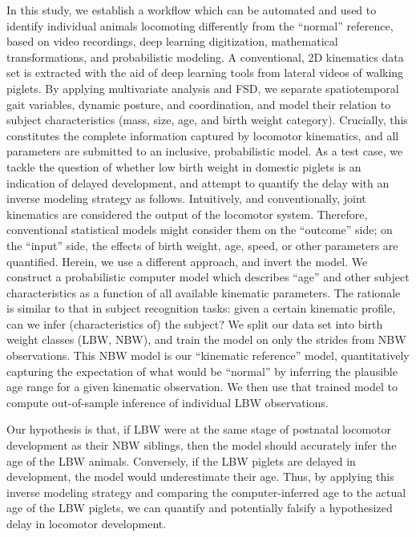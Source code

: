\bigskip
\pagebreak

In this study, we establish a workflow which can be automated and used to identify individual animals locomoting differently from the ``normal'' reference, based on video recordings, deep learning digitization, mathematical transformations, and probabilistic modeling.
A conventional, 2D kinematics data set is extracted with the aid of deep learning tools from lateral videos of walking piglets.
By applying multivariate analysis and FSD, we separate spatiotemporal gait variables, dynamic posture, and coordination, and model their relation to subject characteristics (mass, size, age, and birth weight category).
Crucially, this constitutes the complete information captured by locomotor kinematics, and all parameters are submitted to an inclusive, probabilistic model.
As a test case, we tackle the question of whether low birth weight in domestic piglets is an indication of delayed development, and attempt to quantify the delay with an inverse modeling strategy as follows.
Intuitively, and conventionally, joint kinematics are considered the output of the locomotor system.
Therefore, conventional statistical models might consider them on the ``outcome'' side; on the ``input'' side, the effects of birth weight, age, speed, or other parameters are quantified.
Herein, we use a different approach, and invert the model.
We construct a probabilistic computer model which describes ``age'' and other subject characteristics as a function of all available kinematic parameters.
The rationale is similar to that in subject recognition tasks: given a certain kinematic profile, can we infer (characteristics of) the subject?
We split our data set into birth weight classes (LBW, NBW), and train the model on only the strides from NBW observations.
This NBW model is our ``kinematic reference'' model, quantitatively capturing the expectation of what would be ``normal'' by inferring the plausible age range for a given kinematic observation.
We then use that trained model to compute out-of-sample inference of individual LBW observations.

Our hypothesis is that, if LBW were at the same stage of postnatal locomotor development as their NBW siblings, then the model should accurately infer the age of the LBW animals.
Conversely, if the LBW piglets are delayed in development, the model would underestimate their age.
Thus, by applying this inverse modeling strategy and comparing the computer-inferred age to the actual age of the LBW piglets, we can quantify and potentially falsify a hypothesized delay in locomotor development.


